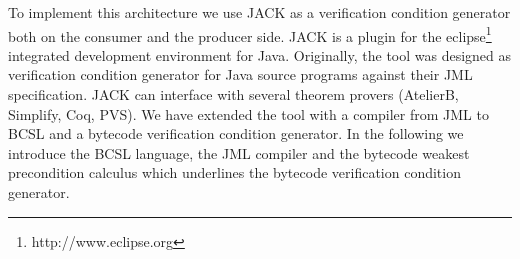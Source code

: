 To implement this architecture we use JACK as a verification condition generator both on the consumer and the
producer side. JACK is a plugin for the eclipse\footnote{http://www.eclipse.org} integrated development environment for Java. Originally, the tool was designed as verification condition generator for Java source programs against their JML specification. JACK can interface with several theorem provers (AtelierB, Simplify, Coq, PVS). We have extended the tool with a compiler from JML to BCSL and a bytecode verification condition generator. In the following we introduce the BCSL language, the JML compiler and the bytecode weakest precondition calculus which underlines the bytecode verification condition generator.
 
